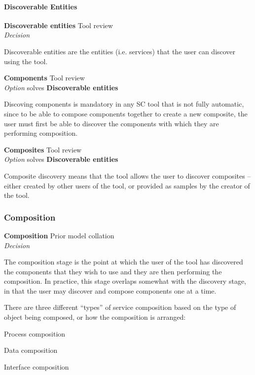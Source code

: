 \paragraph{Discoverable Entities}

\textbf{Discoverable entities} \hfill Tool review \\ \emph{Decision} \hfill 

Discoverable entities are the entities (i.e. services) that the user can discover using the tool.

\textbf{Components} \hfill Tool review \\ \emph{Option} \hfill solves \textbf{Discoverable entities}

Discoving components is mandatory in any SC tool that is not fully automatic, since to be able to compose components together to create a new composite, the user must first be able to discover the components with which they are performing composition.

\textbf{Composites} \hfill Tool review \\ \emph{Option} \hfill solves \textbf{Discoverable entities}

Composite discovery means that the tool allows the user to discover composites -- either created by other users of the tool, or provided as samples by the creator of the tool.

\subsubsection{Composition}

\textbf{Composition} \hfill Prior model collation \cite{Mehandjiev2012} \\ \emph{Decision} \hfill 

The composition stage is the point at which the user of the tool has discovered the components that they wish to use and they are then performing the composition. In practice, this stage overlaps somewhat with the discovery stage, in that the user may discover and compose components one at a time.

There are three different ``types'' of service composition based on the type of object being composed, or how the composition is arranged:
\begin{itemize*}
	\item Process composition
	\item Data composition
	\item Interface composition
\end{itemize*}

